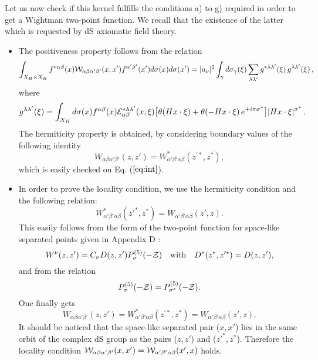 \documentclass[a4paper,11pt,showpacs,preprintnumbers]{revtex4}
\def\z {{\cal Z}}
\begin{document}
Let us now check if this kernel fulfills the conditions a) to g)
required in order to get a Wightman  two-point function. We recall
that  the existence of the latter which is requested by dS
axiomatic field theory.
\begin{itemize}
\item The positiveness property follows from the relation
\begin{equation}
\int _{X_H \times X_H}f^{*\alpha\beta}(x) {\cal
W}_{\alpha\beta\alpha'\beta'}(x,x')
f^{\alpha'\beta'}(x')d\sigma(x)d\sigma(x')=\vert
a_{\nu}\vert^{2}\int_{\gamma}d\sigma_{\gamma}(\xi)\sum_{\lambda\lambda'}
g^{*\lambda\lambda'}(\xi)\,g^{\lambda\lambda'}(\xi)\,,
\end{equation}
where
\begin{equation}
g^{\lambda\lambda'}(\xi)=\int_{X_H}
d\sigma(x)f^{\alpha\beta}(x){\cal
E}^{*\lambda\lambda'}_{\alpha\beta}(x,\xi)\big{[} \theta(H x\cdot
\xi) + \theta(-H x\cdot\xi)\,e^{+i\pi \sigma^{*} } \big{]}\vert H
x\cdot\xi\vert^{\sigma^{*}} \,.
\end{equation}
The hermiticity property is obtained,  by considering boundary
values of the following identity
\begin{equation}
W_{\alpha\beta
\alpha'\beta'}(z,z')=W_{\alpha'\beta'\alpha\beta}^*(z^{\prime*},z^*),
\end{equation}
which is easily checked on Eq.
($\ref{eq:int}$).

\item In order to prove the locality condition, we use  the hermiticity
condition and the following relation:
$$ W^{*}_{\alpha'\beta'\alpha\beta
}(z'^*,z^*)=W_{\alpha'\beta' \alpha\beta }(z',z).$$ This  easily
follows from the form of the two-point function for space-like
separated points given in Appendix D :
$$W^{\nu}(z,z')=C_{\nu}D(z,z')P_{\sigma}^{(5)}(-\z)\quad\mbox{with}\quad
D^{*}(z^*,z'^{*})=D(z,z'),$$ and from the  relation \cite{brvia}
$$P_{\sigma}^{(5)}(-\z) =P_{\sigma^{*}}^{(5)}(-\z). $$ One finally gets
$$W_{\alpha\beta\alpha'\beta'
}(z,z')=W_{\alpha'\beta'\alpha\beta}^*(z^{\prime*},z^*)=W_{\alpha'\beta'
\alpha\beta }(z',z).
$$
It should be noticed that the space-like separated pair ($x,x'$)
lies in the same orbit of the complex dS group as the pairs
($z,z'$) and ($z'^{*},z^*$). Therefore the locality condition
${\cal W}_{\alpha\beta \alpha'\beta'}(x,x')={\cal
W}_{\alpha'\beta' \alpha\beta}(x',x)$ holds.


\end{itemize}
\end{document}
